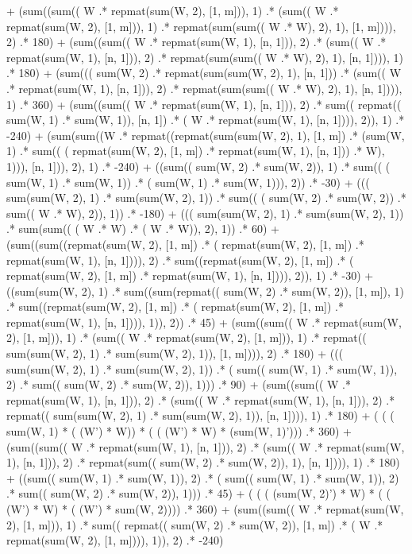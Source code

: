 \documentclass{article}
\begin{document}
  + (sum((sum(( W .* repmat(sum(W, 2), [1, m])), 1)  .* (sum(( W .* repmat(sum(W, 2), [1, m])), 1)  .* repmat(sum(sum(( W .* W), 2), 1), [1, m]))), 2)  .* 180) 
  + (sum((sum(( W .* repmat(sum(W, 1), [n, 1])), 2)  .* (sum(( W .* repmat(sum(W, 1), [n, 1])), 2)  .* repmat(sum(sum(( W .* W), 2), 1), [n, 1]))), 1)  .* 180) 
  + (sum((( sum(W, 2) .* repmat(sum(sum(W, 2), 1), [n, 1]))  .* (sum(( W .* repmat(sum(W, 1), [n, 1])), 2)  .* repmat(sum(sum(( W .* W), 2), 1), [n, 1]))), 1)  .* 360) 
  + (sum((sum(( W .* repmat(sum(W, 1), [n, 1])), 2)  .* sum(( repmat(( sum(W, 1) .* sum(W, 1)), [n, 1]) .* ( W .* repmat(sum(W, 1), [n, 1]))), 2)), 1)  .* -240) 
  + (sum(sum((W  .* repmat((repmat(sum(sum(W, 2), 1), [1, m])  .* (sum(W, 1)  .* sum(( ( repmat(sum(W, 2), [1, m]) .* repmat(sum(W, 1), [n, 1])) .* W), 1))), [n, 1])), 2), 1)  .* -240) 
  + ((sum(( sum(W, 2) .* sum(W, 2)), 1)  .* sum(( ( sum(W, 1) .* sum(W, 1)) .* ( sum(W, 1) .* sum(W, 1))), 2))  .* -30) 
  + ((( sum(sum(W, 2), 1) .* sum(sum(W, 2), 1))  .* sum(( ( sum(W, 2) .* sum(W, 2)) .* sum(( W .* W), 2)), 1))  .* -180) 
  + ((( sum(sum(W, 2), 1) .* sum(sum(W, 2), 1))  .* sum(sum(( ( W .* W) .* ( W .* W)), 2), 1))  .* 60) 
  + (sum((sum((repmat(sum(W, 2), [1, m])  .* ( repmat(sum(W, 2), [1, m]) .* repmat(sum(W, 1), [n, 1]))), 2)  .* sum((repmat(sum(W, 2), [1, m])  .* ( repmat(sum(W, 2), [1, m]) .* repmat(sum(W, 1), [n, 1]))), 2)), 1)  .* -30) 
  + ((sum(sum(W, 2), 1)  .* sum((sum(repmat(( sum(W, 2) .* sum(W, 2)), [1, m]), 1)  .* sum((repmat(sum(W, 2), [1, m])  .* ( repmat(sum(W, 2), [1, m]) .* repmat(sum(W, 1), [n, 1]))), 1)), 2))  .* 45) 
  + (sum((sum(( W .* repmat(sum(W, 2), [1, m])), 1)  .* (sum(( W .* repmat(sum(W, 2), [1, m])), 1)  .* repmat(( sum(sum(W, 2), 1) .* sum(sum(W, 2), 1)), [1, m]))), 2)  .* 180) 
  + ((( sum(sum(W, 2), 1) .* sum(sum(W, 2), 1))  .* ( sum(( sum(W, 1) .* sum(W, 1)), 2) .* sum(( sum(W, 2) .* sum(W, 2)), 1)))  .* 90) 
  + (sum((sum(( W .* repmat(sum(W, 1), [n, 1])), 2)  .* (sum(( W .* repmat(sum(W, 1), [n, 1])), 2)  .* repmat(( sum(sum(W, 2), 1) .* sum(sum(W, 2), 1)), [n, 1]))), 1)  .* 180) 
  + ( ( ( sum(W, 1) * ( (W') * W)) * ( ( (W') * W) * (sum(W, 1)'))) .* 360) 
  + (sum((sum(( W .* repmat(sum(W, 1), [n, 1])), 2)  .* (sum(( W .* repmat(sum(W, 1), [n, 1])), 2)  .* repmat(sum(( sum(W, 2) .* sum(W, 2)), 1), [n, 1]))), 1)  .* 180) 
  + ((sum(( sum(W, 1) .* sum(W, 1)), 2)  .* ( sum(( sum(W, 1) .* sum(W, 1)), 2) .* sum(( sum(W, 2) .* sum(W, 2)), 1)))  .* 45) 
  + ( ( ( (sum(W, 2)') * W) * ( ( (W') * W) * ( (W') * sum(W, 2)))) .* 360) 
  + (sum((sum(( W .* repmat(sum(W, 2), [1, m])), 1)  .* sum(( repmat(( sum(W, 2) .* sum(W, 2)), [1, m]) .* ( W .* repmat(sum(W, 2), [1, m]))), 1)), 2)  .* -240) 
\end{document}
